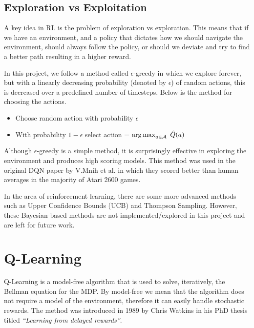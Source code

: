 \subsection{Exploration vs Exploitation}
\label{dsgn:sec:rl:expt-v-explor}
A key idea in RL is the problem of exploration vs exploration. This means that if we have an environment, and a policy that dictates how we should navigate the environment, should always follow the policy, or should we deviate and try to find a better path resulting in a higher reward.

In this project, we follow a method called $\epsilon$-greedy in which we explore forever, but with a linearly decreasing probability (denoted by $\epsilon$) of random actions, this is decreased over a predefined number of timesteps. Below is the method for choosing the actions.

\begin{center}
	\begin{itemize}
		\item Choose random action with probability $\epsilon$
		\item With probability $1 - \epsilon$ select action = $\operatorname*{arg\,max}_{a \in \mathcal{A}}~\hat{Q}(a)$
	\end{itemize}
\end{center}

Although $\epsilon$-greedy is a simple method, it is surprisingly effective in exploring the environment and produces high scoring models. This method was used in the original DQN paper by V.Mnih et al. in which they scored better than human averages in the majority of Atari 2600 games.

In the area of reinforcement learning, there are some more advanced methods such as Upper Confidence Bounds (UCB) and Thompson Sampling. However, these Bayesian-based methods are not implemented/explored in this project and are left for future work.

\newpage

\section{Q-Learning}
\label{dsgn:sec:qlearning}
Q-Learning is a model-free algorithm that is used to solve, iteratively, the Bellman equation for the MDP. By model-free we mean that the algorithm does not require a model of the environment, therefore it can easily handle stochastic rewards. The method was introduced in 1989 by Chris Watkins in his PhD thesis titled \textit{``Learning from delayed rewards''}.

